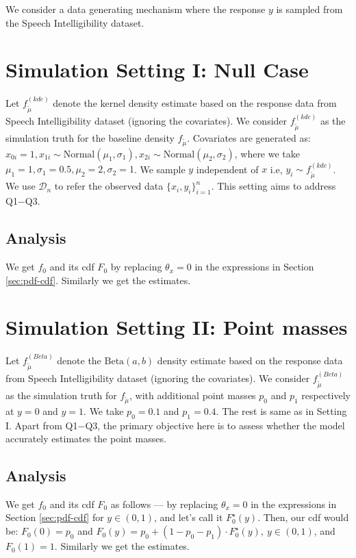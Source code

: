 \documentclass[10pt, oneside]{article}   	%
\newcommand{\refa}[1]{\textcolor{blue}{\ref{#1}}}
\newcommand{\tmu}{\widetilde{\mu}}
\begin{document}
We consider a data generating mechanism where the response $y$ is sampled from the Speech Intelligibility dataset.



\section{Simulation Setting I: Null Case}
Let $f^{(kde)}_{\tmu}$ denote the kernel density estimate based on the response data from Speech Intelligibility dataset (ignoring the covariates). We consider $f^{(kde)}_{\tmu}$ as the simulation truth for the baseline density $f_{\tmu}$. Covariates are generated as: $x_{0i} = 1, x_{1i} \sim \text{Normal}(\mu_1, \sigma_1), x_{2i} \sim \text{Normal}(\mu_2, \sigma_2)$, where we take $\mu_1 = 1, \sigma_1 = 0.5, \mu_2 = 2, \sigma_2 = 1$. We sample $y$ independent of $x$ i.e, $y_i \sim f^{(kde)}_{\tmu}$. We use $\mathcal{D}_n$ to refer the observed data $\{x_i, y_i\}_{i=1}^n$. This setting aims to address Q1$-$Q3.  

\subsection{Analysis}
We get $f_0$ and its cdf $F_0$ by replacing $\theta_x = 0$ in the expressions in Section \refa{sec:pdf-cdf}. Similarly we get the estimates.


\section{Simulation Setting II: Point masses} 
Let $f^{(Beta)}_{\tmu}$ denote the $\text{Beta}(a,b)$ density estimate based on the response data from Speech Intelligibility dataset (ignoring the covariates). We consider $f^{(Beta)}_{\tmu}$ as the simulation truth for $f_{\tmu}$, with additional point masses $p_0$ and $p_1$ respectively at $y = 0$ and $y = 1$. We take $p_0 = 0.1$ and $p_1 = 0.4$. The rest is same as in Setting I. Apart from Q1$-$Q3, the primary objective here is to assess whether the model accurately estimates the point masses. 

\subsection{Analysis}
We get $f_0$ and its cdf $F_0$ as follows --- by replacing $\theta_x = 0$ in the expressions in Section \refa{sec:pdf-cdf} for $y \in (0,1)$, and let's call it $F^\star_0(y)$. Then, our cdf would be: $F_0(0) = p_0$ and $F_0(y) = p_0 + (1 - p_0 - p_1) \cdot F^\star_0(y), \ y \in (0,1)$, and $F_0(1) = 1$. Similarly we get the estimates.
\end{document}
